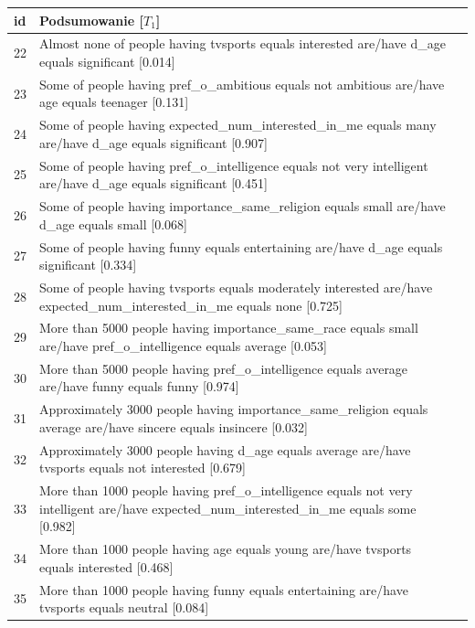 \documentclass{classrep}
\begin{document}
\begin{center}
  \begin{table}[H]
    \begin{tabularx}{\textwidth}{lXc}
    
    id & Podsumowanie [$T_1$] \\ \hline 
  
    22 & Almost none of people having tvsports equals interested are/have d\_age equals significant [0.014] \\ \hline
    23 & Some of people having pref\_o\_ambitious equals not ambitious are/have age equals teenager [0.131] \\ \hline
    24 & Some of people having expected\_num\_interested\_in\_me equals many are/have d\_age equals significant [0.907] \\ \hline
    25 & Some of people having pref\_o\_intelligence equals not very intelligent are/have d\_age equals significant [0.451] \\ \hline
    26 & Some of people having importance\_same\_religion equals small are/have d\_age equals small [0.068] \\ \hline
    27 & Some of people having funny equals entertaining are/have d\_age equals significant [0.334]\\ \hline
    28 & Some of people having tvsports equals moderately interested are/have expected\_num\_interested\_in\_me equals none [0.725] \\ \hline 
    29 & More than 5000 people having importance\_same\_race equals small are/have pref\_o\_intelligence equals average [0.053]\\ \hline 
    30 & More than 5000 people having pref\_o\_intelligence equals average are/have funny equals funny [0.974]\\ \hline 
    31 & Approximately 3000 people having importance\_same\_religion equals average are/have sincere equals insincere [0.032]\\ \hline
    32 & Approximately 3000 people having d\_age equals average are/have tvsports equals not interested [0.679] \\ \hline
    33 & More than 1000 people having pref\_o\_intelligence equals not very intelligent are/have expected\_num\_interested\_in\_me equals some [0.982] \\ \hline
    34 & More than 1000 people having age equals young are/have tvsports equals interested [0.468] \\ \hline
    35 & More than 1000 people having funny equals entertaining are/have tvsports equals neutral [0.084] \\ \hline

\end{tabularx}
\end{table}
\end{center}
\end{document}
